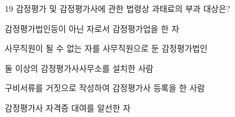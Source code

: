 \begin{question}{19}
감정평가 및 감정평가사에 관한 법령상 과태료의 부과 대상은?
\begin{choices}
  \item 감정평가법인등이 아닌 자로서 감정평가업을 한 자
  \item 사무직원이 될 수 없는 자를 사무직원으로 둔 감정평가법인
  \item 둘 이상의 감정평가사사무소를 설치한 사람
  \item 구비서류를 거짓으로 작성하여 감정평가사 등록을 한 사람
  \item 감정평가사 자격증 대여를 알선한 자
\end{choices}
\end{question}
